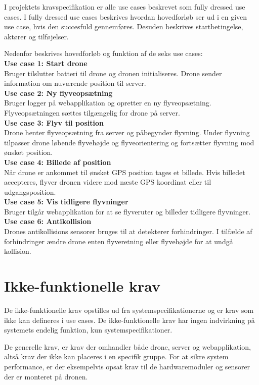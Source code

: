 I projektets kravspecifikation er alle use cases beskrevet som fully dressed use cases. I fully dressed use cases beskrives hvordan hovedforløb ser ud i en given use case, hvis den succesfuld gennemføres. Desuden beskrives startbetingelse, aktører og tilføjelser.

Nedenfor beskrives hovedforløb og funktion af de seks use cases:\\

\textbf{Use case 1: Start drone} \\
Bruger tilslutter batteri til drone og dronen initialiseres. Drone sender information om nuværende position til server.\\

\textbf{Use case 2: Ny flyveopsætning} \\
Bruger logger på webapplikation og opretter en ny flyveopsætning. Flyveopsætningen sættes tilgængelig for drone på server.\\

\textbf{Use case 3: Flyv til position}\\
Drone henter flyveopsætning fra server og påbegynder flyvning. Under flyvning tilpasser drone  løbende flyvehøjde og flyveorientering og fortsætter flyvning mod ønsket position. \\

\textbf{Use case 4: Billede af position} \\
Når drone er ankommet til ønsket GPS position tages et billede. Hvis billedet accepteres, flyver dronen videre mod næste GPS koordinat eller til udgangsposition. \\

\textbf{Use case 5: Vis tidligere flyvninger} \\
Bruger tilgår webapplikation for at se flyveruter og billeder tidligere flyvninger.\\

\textbf{Use case 6: Antikollision} \\
Drones antikollisions sensorer bruges til at detekterer forhindringer. I tilfælde af forhindringer ændre drone enten flyveretning eller flyvehøjde for at undgå kollision. \\



\section{Ikke-funktionelle krav}

De ikke-funktionelle krav opstilles ud fra systemspecifikationerne og er krav som ikke kan defineres i use cases. De ikke-funktionelle krav har ingen indvirkning på systemets endelig funktion, kun systemspecifikationer.  

De generelle krav, er krav der omhandler både drone, server og webapplikation, altså krav der ikke kan placeres i en specifik gruppe. For at sikre system performance, er der eksempelvis opsat krav til de hardwaremoduler og sensorer der er monteret på dronen. 
